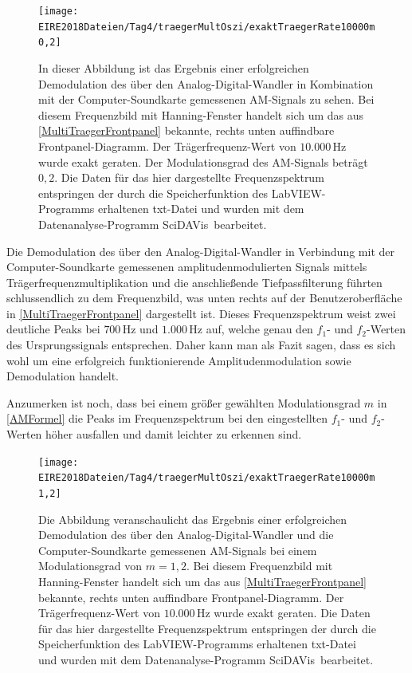 \documentclass[
a4paper,
12pt,
pagesize,
ngerman
]{scrartcl}
\begin{document}
	\begin{figure}[H]
		\centering
		\texttt{[image: EIRE2018Dateien/Tag4/traegerMultOszi/exaktTraegerRate10000m0,2]}
		\caption{In dieser Abbildung ist das Ergebnis einer erfolgreichen Demodulation des über den Analog-Digital-Wandler in Kombination mit der Computer-Soundkarte gemessenen AM-Signals zu sehen. Bei diesem Frequenzbild mit Hanning-Fenster handelt sich um das aus \cref{MultiTraegerFrontpanel} bekannte, rechts unten auffindbare Frontpanel-Diagramm. Der Trägerfrequenz-Wert von $10.000\,$Hz wurde exakt geraten. Der Modulationsgrad des AM-Signals beträgt $0,2$. Die Daten für das hier dargestellte Frequenzspektrum entspringen der durch die Speicherfunktion des LabVIEW-Programms erhaltenen txt-Datei und wurden mit dem Datenanalyse-Programm \glqq SciDAVis\grqq\ bearbeitet.}
		\label{AMDemodsuccm02}
	\end{figure}

	\noindent Die Demodulation des über den Analog-Digital-Wandler in Verbindung mit der Computer-Soundkarte gemessenen amplitudenmodulierten Signals mittels Trägerfrequenzmultiplikation und die anschließende Tiefpassfilterung führten schlussendlich zu dem Frequenzbild, was unten rechts auf der Benutzeroberfläche in \cref{MultiTraegerFrontpanel} dargestellt ist.
	Dieses Frequenzspektrum weist zwei deutliche Peaks bei $700\,$Hz und $1.000\,$Hz auf, welche genau den $f_1$- und $f_2$-Werten des Ursprungssignals entsprechen. 
	Daher kann man als Fazit sagen, dass es sich wohl um eine erfolgreich funktionierende Amplitudenmodulation sowie Demodulation handelt. 
	
	Anzumerken ist noch, dass bei einem größer gewählten Modulationsgrad $m$ in \cref{AMFormel} die Peaks im Frequenzspektrum bei den eingestellten $f_1$- und $f_2$-Werten höher ausfallen und damit leichter zu erkennen sind. 
	
	\begin{figure}[H]
		\centering
		\texttt{[image: EIRE2018Dateien/Tag4/traegerMultOszi/exaktTraegerRate10000m1,2]}
		\caption{Die Abbildung veranschaulicht das Ergebnis einer erfolgreichen Demodulation des über den Analog-Digital-Wandler und die Computer-Soundkarte gemessenen AM-Signals bei einem Modulationsgrad von $m = 1,2$. Bei diesem Frequenzbild mit Hanning-Fenster handelt sich um das aus \cref{MultiTraegerFrontpanel} bekannte, rechts unten auffindbare Frontpanel-Diagramm. Der Trägerfrequenz-Wert von $10.000\,$Hz wurde exakt geraten. Die Daten für das hier dargestellte Frequenzspektrum entspringen der durch die Speicherfunktion des LabVIEW-Programms erhaltenen txt-Datei und wurden mit dem Datenanalyse-Programm \glqq SciDAVis\grqq\ bearbeitet.}
		\label{AMDemodsuccm12}
	\end{figure}
\end{document}
